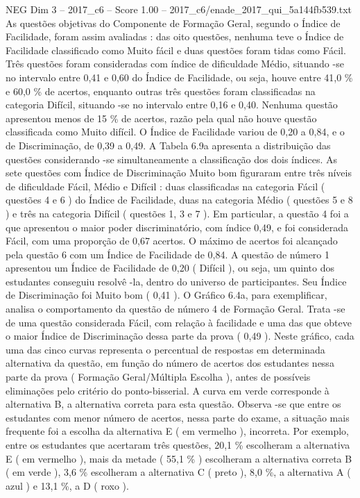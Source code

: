 \begin{textsample}{NEG Dim 3 – 2017\_c6 – Score 1.00 – 2017\_c6/enade\_2017\_qui\_5a144fb539.txt}
As questões objetivas do Componente de Formação Geral, segundo o Índice de Facilidade, foram assim avaliadas : das oito questões, nenhuma teve o Índice de Facilidade classificado como Muito fácil e duas questões foram tidas como Fácil.
Três questões foram consideradas com índice de dificuldade Médio, situando -se no intervalo entre 0,41 e 0,60 do Índice de Facilidade, ou seja, houve entre 41,0 \% e 60,0 \% de acertos, enquanto outras três questões foram classificadas na categoria Difícil, situando -se no intervalo entre 0,16 e 0,40.
Nenhuma questão apresentou menos de 15 \% de acertos, razão pela qual não houve questão classificada como Muito difícil.
O Índice de Facilidade variou de 0,20 a 0,84, e o de Discriminação, de 0,39 a 0,49.
A Tabela 6.9a apresenta a distribuição das questões considerando -se simultaneamente a classificação dos dois índices.
As sete questões com Índice de Discriminação Muito bom figuraram entre três níveis de dificuldade Fácil, Médio e Difícil : duas classificadas na categoria Fácil ( questões 4 e 6 ) do Índice de Facilidade, duas na categoria Médio ( questões 5 e 8 ) e três na categoria Difícil ( questões 1, 3 e 7 ).
Em particular, a questão 4 foi a que apresentou o maior poder discriminatório, com índice 0,49, e foi considerada Fácil, com uma proporção de 0,67 acertos.
O máximo de acertos foi alcançado pela questão 6 com um Índice de Facilidade de 0,84.
A questão de número 1 apresentou um Índice de Facilidade de 0,20 ( Difícil ), ou seja, um quinto dos estudantes conseguiu resolvê -la, dentro do universo de participantes.
Seu Índice de Discriminação foi Muito bom ( 0,41 ).
O Gráfico 6.4a, para exemplificar, analisa o comportamento da questão de número 4 de Formação Geral.
Trata -se de uma questão considerada Fácil, com relação à facilidade e uma das que obteve o maior Índice de Discriminação dessa parte da prova ( 0,49 ).
Neste gráfico, cada uma das cinco curvas representa o percentual de respostas em determinada alternativa da questão, em função do número de acertos dos estudantes nessa parte da prova ( Formação Geral/Múltipla Escolha ), antes de possíveis eliminações pelo critério do ponto-bisserial.
A curva em verde corresponde à alternativa B, a alternativa correta para esta questão.
Observa -se que entre os estudantes com menor número de acertos, nessa parte do exame, a situação mais frequente foi a escolha da alternativa E ( em vermelho ), incorreta.
Por exemplo, entre os estudantes que acertaram três questões, 20,1 \% escolheram a alternativa E ( em vermelho ), mais da metade ( 55,1 \% ) escolheram a alternativa correta B ( em verde ), 3,6 \% escolheram a alternativa C ( preto ), 8,0 \%, a alternativa A ( azul ) e 13,1 \%, a D ( roxo ).

\end{textsample}
